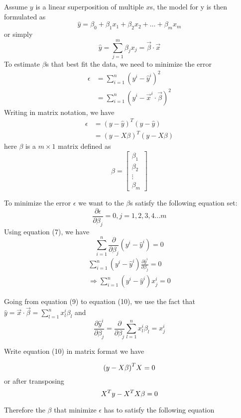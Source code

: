 \documentclass[12pt, oneside]{article}
\begin{document}
Assume $y$ is a linear superposition of multiple $x$s, the model for y is then formulated as 
$$\hat{y}=\beta_{0}+\beta_{1}x_1+\beta_{2}x_2+\hdots+\beta_{m}x_m$$
or simply
$$
\hat{y}=\sum\limits_{j=1}^{m}\beta_j x_j=\vec{\beta}\cdot\vec{x}
$$
To estimate $\beta$s that best fit the data, we need to minimize the error
\begin{align}
\epsilon&={\sum\limits_{i=1}^{n}(y^{i}-\hat{y}^{i})^2}\\
&={\sum\limits_{i=1}^{n}(y^{i}-\vec{x}^i\cdot\vec{\beta})^2}
\end{align}
Writing in matrix notation, we have
\begin{align*}
\epsilon&={(y-\hat{y})^T(y-\hat{y})}\\
&=(y-X\beta)^T(y-X\beta)
\end{align*}
here $\beta$ is a $m\times1$ matrix defined as 
$$
\beta=\begin{bmatrix}
    \beta_1\\
    \beta_2\\
	\vdots\\
    \beta_m
\end{bmatrix}
$$

To minimize the error $\epsilon$ we want to the ${\beta}$s satisfy the following equation set:
$$
\frac{\partial \epsilon}{\partial \beta_j}=0, j=1, 2, 3, 4 ... m
$$
Using equation (7), we have 
$$
{\sum\limits_{i=1}^{n}\frac{\partial}{\partial \beta_j}(y^{i}-\hat{y}^{i})=0}
$$
\begin{align}
\sum\limits_{i=1}^{n}(y^{i}-\hat{y}^{i})\frac{\partial\hat{y}^{i}}{\partial \beta_j}=0\\
\Rightarrow
\sum\limits_{i=1}^{n}(y^{i}-\hat{y}^{i})x^{i}_{j}=0
\end{align}

Going from equation (9) to equation (10), we use the fact that $\hat{y}=\vec{x}\cdot\vec{\beta}=\sum\limits_{l=1}^{n}x_l^i\beta_l$ and
\begin{equation}
\frac{\partial{\hat{y}^i}}{\partial{\beta_j}}=\frac{\partial}{\partial \beta_j}\sum\limits_{l=1}^{n}x_l^i\beta_l=x_j^i
\end{equation}

Write equation (10) in matrix format we have

$$
\mathnormal{(y-X \beta)}^{T}\mathnormal{X}=0
$$
or after transposing
$$
\mathnormal{X^{T}}\mathnormal{y}-\mathnormal{X^T}\mathnormal{X}\beta=0
$$

Therefore the $\beta$ that minimize $\epsilon$ has to satisfy the following equation
\end{document}
